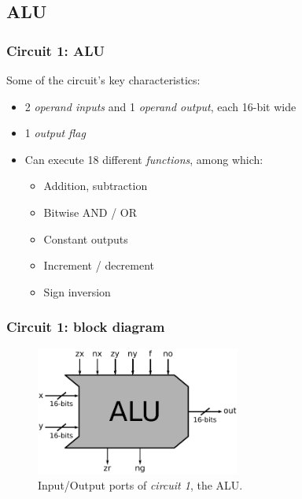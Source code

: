     \subsection{ALU}
    \label{subsec:alu}
        \begin{frame}
            \frametitle{Circuit 1: ALU}

            \par{Some of the circuit's key characteristics:}

            \begin{itemize}
                \item 2 \emph{operand inputs} and 1 \emph{operand output}, each 16-bit wide
                \item 1 \emph{output flag}
                \item Can execute 18 different \emph{functions}, among which:
                    \begin{itemize}
                        \item Addition, subtraction
                        \item Bitwise AND / OR
                        \item Constant outputs
                        \item Increment / decrement
                        \item Sign inversion
                    \end{itemize}
            \end{itemize}

        \end{frame}

        \begin{frame}
            \frametitle{Circuit 1: block diagram}

            \begin{figure}[h!]
                \centerline{\includegraphics[width=0.6\textwidth]{imgs/alu-block.pdf}}
                \caption{Input/Output ports of \emph{circuit 1}, the ALU.
                    \label{fig:alu-block}}
            \end{figure}

        \end{frame}

